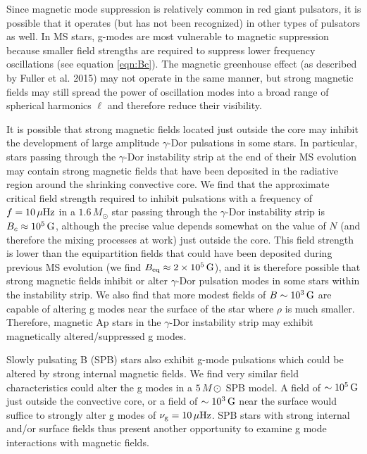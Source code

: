 Since magnetic mode suppression is relatively common in red giant pulsators, it is possible that it operates (but has not been recognized) in other types of pulsators as well. In MS stars, g-modes are most vulnerable to magnetic suppression because smaller field strengths are required to suppress lower frequency oscillations (see equation \ref{eqn:Bc}). The magnetic greenhouse effect (as described by Fuller et al. 2015) may not operate in the same manner, but strong magnetic fields may still spread the power of oscillation modes into a broad range of spherical harmonics $\ell$ and therefore reduce their visibility. 

It is possible that strong magnetic fields located just outside the core may inhibit the development of large amplitude $\gamma$-Dor pulsations in some stars. In particular, stars passing through the $\gamma$-Dor instability strip at the end of their MS evolution may contain strong magnetic fields that have been deposited in the radiative region around the shrinking convective core. We find that the approximate critical field strength required to inhibit pulsations with a frequency of $f = 10 \, \mu {\rm Hz}$ in a $1.6 \, M_\odot$ star passing through the $\gamma$-Dor instability strip is $B_c \approx 10^5 \, {\rm G}$, although the precise value depends somewhat on the value of $N$ (and therefore the mixing processes at work) just outside the core. This field strength is lower than the equipartition fields that could have been deposited during previous MS evolution (we find $B_{\rm eq} \approx 2 \times 10^5 \, {\rm G}$), and it is therefore possible that strong magnetic fields inhibit or alter $\gamma$-Dor pulsation modes in some stars within the instability strip. We also find that more modest fields of $B \sim 10^{3} \, {\rm G}$ are capable of altering g modes near the surface of the star where $\rho$ is much smaller. Therefore, magnetic Ap stars in the $\gamma$-Dor instability strip may exhibit magnetically altered/suppressed g modes. 

Slowly pulsating B (SPB) stars also exhibit g-mode pulsations which could be altered by strong internal magnetic fields. We find very similar field characteristics could alter the g modes in a $5 \, M\odot$ SPB model. A field of $\sim 10^5 \, {\rm G}$ just outside the convective core, or a field of $\sim 10^{3} \, {\rm G}$ near the surface would suffice to strongly alter g modes of $\nu_{\rm g} = 10 \, \mu {\rm Hz}$. SPB stars with strong internal and/or surface fields thus present another opportunity to examine g mode interactions with magnetic fields.


  
  
  
  
  
  
  
  
  
  
  
  
  
  
  
  
  
  
  
  
  
  
  
  
  